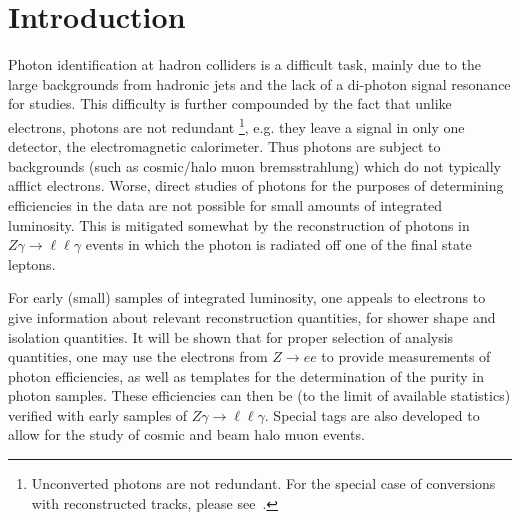 \documentclass{cmspaper}
\begin{document}
\setcounter{page}{2}%

\section{Introduction}
Photon identification at hadron colliders is a difficult task, mainly due to the large backgrounds from hadronic jets and
the lack of a di-photon signal resonance for studies.  This difficulty is further compounded by the fact that unlike electrons,
photons are not redundant
\footnote{Unconverted photons are not redundant.  For the special case of conversions with reconstructed
tracks, please see~\cite{NancyConv}.}, e.g. they leave a signal in only one detector, the electromagnetic calorimeter.  Thus photons are subject to backgrounds (such as cosmic/halo muon bremsstrahlung) which do not typically afflict electrons.
Worse, direct studies of photons for the purposes of determining efficiencies in the data are not possible for small amounts of integrated luminosity.  This is mitigated somewhat by the reconstruction of photons in $Z\gamma\rightarrow\ell\ell\gamma$ events in which the photon is radiated off one of the final state leptons.

For early (small) samples of integrated luminosity, one appeals to electrons to give information about relevant reconstruction quantities, for shower shape and isolation quantities.  It will be shown that for proper selection of analysis quantities, one may use the electrons from $Z\rightarrow ee$ to provide measurements of photon efficiencies, as well as templates for the determination of the purity in photon samples.  These efficiencies can then be (to the limit of available statistics) verified with early samples of $Z\gamma\rightarrow\ell\ell\gamma$.  Special tags are also developed to allow for the study of cosmic and beam halo muon events. 
\end{document}

